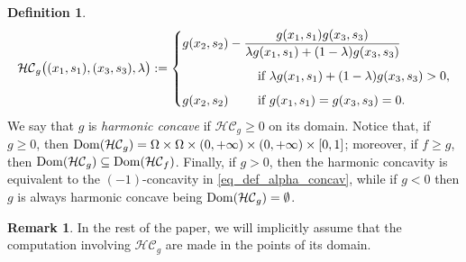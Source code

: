 \documentclass[11pt, reqno]{amsart}
\theoremstyle{definition}
\newtheorem{remark}[lemma]{Remark}
\newtheorem{definition}[lemma]{Definition}
\numberwithin{equation}{section}
\newcommand{\R}{\mathbb{R}}
\newcommand{\mc}[1]{\mathcal{#1}}
\newcommand{\Dom}{{\rm Dom}}
\newcommand{\tr}[1]{{\color{red} #1}}
\begin{document}
\begin{definition}
	\begin{equation*}
		\mathcal{HC}_g\big((x_1,s_1),(x_3,s_3),\lambda\big):=
		\begin{dcases}
			\mathmakebox[4em][l]{g(x_2,s_2)-\dfrac{g(x_1,s_1)g(x_3,s_3)}{\lambda g(x_1,s_1)+(1-\lambda)g(x_3,s_3)}} \\[1ex]
			\quad\quad\qquad\qquad\text{if } \lambda g(x_1,s_1)+(1-\lambda)g(x_3,s_3)>0,
			\\[1ex]
			g(x_2,s_2)
			\qquad\text{ if } 
			g(x_1,s_1)=g(x_3,s_3)=0.
		\end{dcases}
	\end{equation*}
We say that $g$ is \emph{harmonic concave} if $\mathcal{HC}_g \geq 0$ on its domain.
	Notice that, if $g \geq 0$, %
then 
$\Dom(\mathcal{HC}_g)=\Omega\times\Omega\times(0,+\infty)\times(0,+\infty)\times[0,1]$; moreover, if $f\geq g$, then $\Dom(\mc{HC}_g) \subseteq \Dom(\mc{HC}_f)$. Finally, if $g>0$, then the harmonic concavity is equivalent to the $(-1)$-concavity in \eqref{eq_def_alpha_concav}, while if $g<0$ then $g$ is always harmonic concave being $\Dom(\mc{HC}_g)=\emptyset$.
\begin{remark}
In the rest of the paper, we will implicitly assume that the computation involving $\mc{HC}_g$ are made in the points of its domain.
\end{remark}
\end{definition}
\end{document}
